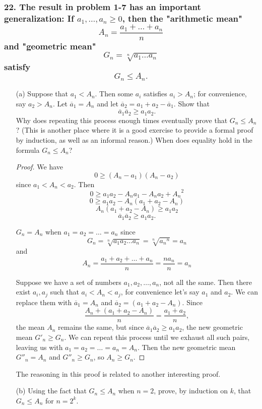 \documentclass{article}
\begin{document}
\subsubsection*{22. The result in problem 1-7 has an important generalization: If $a_1, \dots, a_n \ge 0$, then the "arithmetic mean" \[A_n = \frac{a_1 + \dots + a_n}{n}\] and "geometric mean" \[G_n = \sqrt[n]{a_1\dots a_n}\] satisfy \[G_n \le A_n.\]}
\begin{enumerate}
	\item[(a)] Suppose that $a_1 < A_n$. Then some $a_i$ satisfies $a_i > A_n$; for convenience, say $a_2 > A_n$. Let $\overline{a}_1 = A_n$ and let $\overline{a}_2 = a_1 + a_2 - \overline{a}_1$. Show that \[\overline{a}_1\overline{a}_2 \ge a_1a_2.\] Why does repeating this process enough times eventually prove that $G_n \le A_n$? (This is another place where it is a good exercise to provide a formal proof by induction, as well as an informal reason.) When does equality hold in the formula $G_n \le A_n$?
	
	\begin{proof}
		We have \[0 \ge (A_n - a_1)(A_n - a_2)\]since $a_1 < A_n < a_2$. Then
		\[0 \ge a_1a_2 - A_na_1 - A_na_2 + {A_n}^2\]
		\[0 \ge a_1a_2 - A_n(a_1 + a_2 - A_n)\]
		\[A_n(a_1 + a_2 - A_n) \ge a_1a_2\]
		\[\overline{a}_1\overline{a}_2 \ge a_1a_2.\]

		$G_n = A_n$ when $a_1 = a_2 = \dots = a_n$ since
		\[G_n = \sqrt[n]{a_1a_2\dots a_n} = \sqrt[n]{{a_n}^n} = a_n\] and\[A_n = \frac{a_1 + a_2 + \dots + a_n}{n} = \frac{na_n}{n} = a_n\]

		Suppose we have a set of numbers $a_1, a_2, \dots, a_n$, not all the same. Then there exist $a_i, a_j$ such that $a_i < A_n < a_j$, for convenience let's say $a_1$ and $a_2$. We can replace them with $\overline{a}_1 = A_n$ and $\overline{a}_2 = (a_1 + a_2 - A_n)$. Since \[\frac{A_n + (a_1 + a_2 - A_n)}{n} = \frac{a_1 + a_2}{n},\] the mean $A_n$ remains the same, but since $\overline{a}_1\overline{a}_2 \ge a_1a_2$, the new geometric mean $G'_n \ge G_n$. We can repeat this process until we exhaust all such pairs, leaving us with $a_1 = a_2 = \dots = a_n = A_n$. Then the new geometric mean $G''_n = A_n$ and $G''_n \ge G_n$, so $A_n \ge G_n$.
	\end{proof}
	
	The reasoning in this proof is related to another interesting proof.

	\item[(b)] Using the fact that $G_n \le A_n$ when $n = 2$, prove, by induction on $k$, that $G_n \le A_n$ for $n = 2^k$.
	

\end{enumerate}
\end{document}
